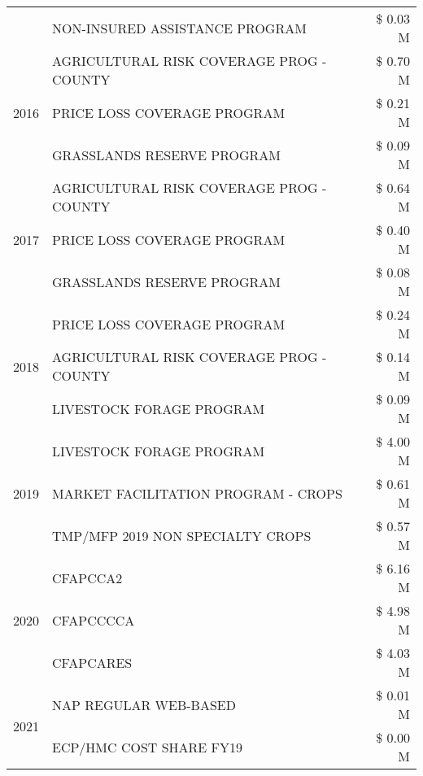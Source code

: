 \begin{tabular}{llr}
 & NON-INSURED ASSISTANCE PROGRAM & \$ 0.03 M \\
\cline{1-3}
\multirow[t]{3}{*}{2016} & AGRICULTURAL RISK COVERAGE PROG - COUNTY & \$ 0.70 M \\
 & PRICE LOSS COVERAGE PROGRAM & \$ 0.21 M \\
 & GRASSLANDS RESERVE PROGRAM & \$ 0.09 M \\
\cline{1-3}
\multirow[t]{3}{*}{2017} & AGRICULTURAL RISK COVERAGE PROG - COUNTY & \$ 0.64 M \\
 & PRICE LOSS COVERAGE PROGRAM & \$ 0.40 M \\
 & GRASSLANDS RESERVE PROGRAM & \$ 0.08 M \\
\cline{1-3}
\multirow[t]{3}{*}{2018} & PRICE LOSS COVERAGE PROGRAM & \$ 0.24 M \\
 & AGRICULTURAL RISK COVERAGE PROG - COUNTY & \$ 0.14 M \\
 & LIVESTOCK FORAGE PROGRAM & \$ 0.09 M \\
\cline{1-3}
\multirow[t]{3}{*}{2019} & LIVESTOCK FORAGE PROGRAM & \$ 4.00 M \\
 & MARKET FACILITATION PROGRAM - CROPS & \$ 0.61 M \\
 & TMP/MFP 2019 NON SPECIALTY CROPS & \$ 0.57 M \\
\cline{1-3}
\multirow[t]{3}{*}{2020} & CFAPCCA2 & \$ 6.16 M \\
 & CFAPCCCCA & \$ 4.98 M \\
 & CFAPCARES & \$ 4.03 M \\
\cline{1-3}
\multirow[t]{2}{*}{2021} & NAP REGULAR WEB-BASED & \$ 0.01 M \\
 & ECP/HMC COST SHARE FY19 & \$ 0.00 M \\
\cline{1-3}
\bottomrule
\end{tabular}
